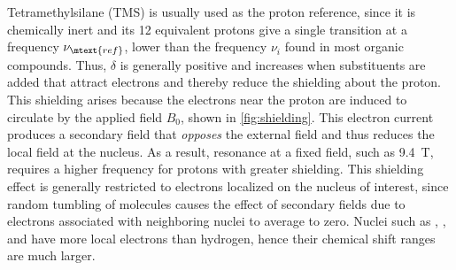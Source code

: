 Tetramethylsilane (TMS) is usually used as the proton reference, since it is chemically inert and its 12 equivalent protons give a single transition at a frequency \( \nu_\mtext{ref} \), lower than the frequency \( \nu_i \) found in most organic compounds. 
Thus, \( \delta \) is generally positive and increases when substituents are added that attract electrons and thereby reduce the shielding about the proton. 
This shielding arises because the electrons near the proton are induced to circulate by the applied field \( B_0 \), shown in \cref{fig:shielding}. 
This electron current produces a secondary field that \emph{opposes} the external field and thus reduces the local field at the nucleus. 
As a result, resonance at a fixed field, such as \qty{9.4}{\tesla}, requires a higher frequency for protons with greater shielding. 
This shielding effect is generally restricted to electrons localized on the nucleus of interest, since random tumbling of molecules causes the effect of secondary fields due to electrons associated with neighboring nuclei to average to zero. 
Nuclei such as , , and  have more local electrons than hydrogen, hence their chemical shift ranges are much larger. 

